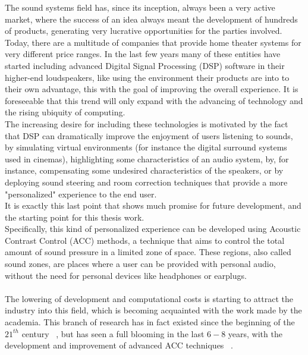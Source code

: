 The sound systems field has, since its inception, always been a very active market, where the success of an idea always meant the development of hundreds of products, generating very lucrative opportunities for the parties involved. Today, there are a multitude of companies that provide home theater systems for very different price ranges. In the last few years many of these entities have started including advanced Digital Signal Processing (DSP) software in their higher-end loudspeakers, like using the environment their products are into to their own advantage, this with the goal of improving the overall experience. It is foreseeable that this trend will only expand with the advancing of technology and the rising ubiquity of computing.
\\
The increasing desire for including these technologies is motivated by the fact that DSP can dramatically improve the enjoyment of users listening to sounds, by simulating virtual environments (for instance the digital surround systems used in cinemas), highlighting some characteristics of an audio system, by, for instance, compensating some undesired characteristics of the speakers, or by deploying sound steering and room correction techniques that provide a more "personalized" experience to the end user.
\\
It is exactly this last point that shows much promise for future development, and the starting point for this thesis work.
\\
Specifically, this kind of personalized experience can be developed using Acoustic Contrast Control (ACC) methods, a technique that aims to control the total amount of sound pressure in a limited zone of space. These regions, also called sound zones, are places where a user can be provided with personal audio, without the need for personal devices like headphones or earplugs.
\\
\\
The lowering of development and computational costs is starting to attract the industry into this field, which is becoming acquainted with the work made by the academia. This branch of research has in fact existed since the beginning of the $21^{th}$ century ~\parencite{choi_generation_2002},  but has seen a full blooming in the last $6-8$ years, with the development and improvement of advanced ACC techniques ~\parencite{elliott_robustness_2012,schellekens_time_2016,cai_time-domain_2014,chang_realization_2009}.
\\
\\
